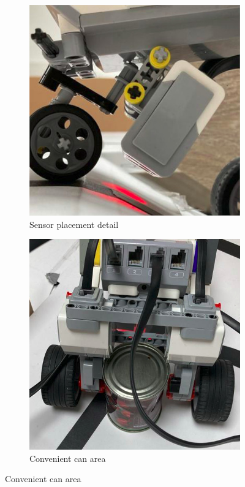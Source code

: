 \documentclass{article}
\begin{document}
\begin{figure}[!htbp]
	\begin{subfigure}{0.48\textwidth}
		\includegraphics[width=\textwidth]{./figures/old-coaster-wheel.jpeg}
		\caption{Sensor placement detail}%
	\end{subfigure}
	\hfill
	\begin{subfigure}{0.48\textwidth}
		\includegraphics[width=\textwidth]{./figures/old-can-placement.jpeg}
		\caption{Convenient can area}%
	\end{subfigure}
	

\end{figure}
\end{document}

